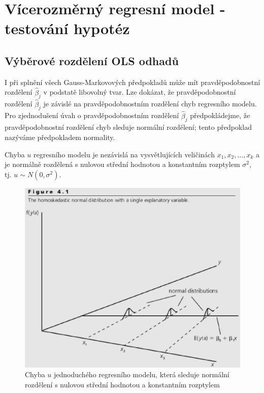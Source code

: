 \chapter[Vícerozměrný regresní model \\ Testování hypotéz]{Vícerozměrný regresní model - testování hypotéz}

\section{Výběrové rozdělení OLS odhadů}

I při splnění všech Gauss-Markovových předpokladů může mít pravděpodobnostní rozdělení $\hat{\beta}_j$ v podstatě libovolný tvar. 
Lze dokázat, že pravděpodobnostní rozdělení $\hat{\beta}_j$ je závislé na pravděpodobnostním rozdělení chyb regresního modelu. 
Pro zjednodušení úvah o pravděpodobnostním rozdělení $\hat{\beta}_j$ předpokládejme, že pravděpodobnostní rozdělení chyb sleduje 
normální rozdělení; tento předpoklad nazýváme předpokladem normality.

\begin{assumption}
Chyba $u$ regresního modelu je nezávislá na vysvětlujících veličinách $x_1, x_2, ..., x_k$ a je normálně rozdělená s nulovou střední 
hodnotou a konstantním rozptylem $\sigma^2$, tj. $u \sim N(0, \sigma^2)$.

\raggedleft{$\clubsuit$}
\end{assumption}

\begin{figure}[htp]
\centering
\includegraphics[scale = 0.5]{pictures/figure_4_1.eps}
\caption{Chyba $u$ jednoduchého regresního modelu, která sleduje normální rozdělení s nulovou střední hodnotou a konstantním rozptylem}
\label{figure_4_1}
\end{figure} 


